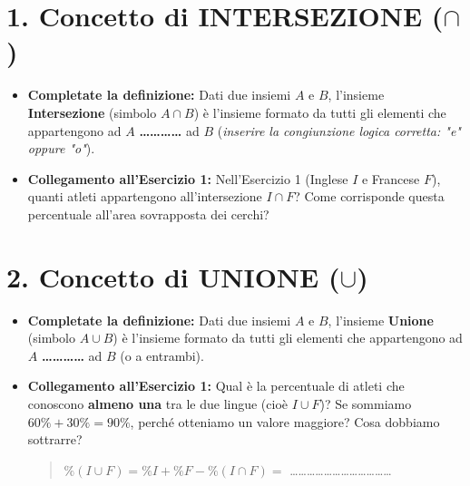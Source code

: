 \documentclass[11pt, a4paper]{article}
\begin{document}
\section*{1. Concetto di INTERSEZIONE ($\cap$)}
\begin{itemize}
    \item \textbf{Completate la definizione:} Dati due insiemi $A$ e $B$, l'insieme \textbf{Intersezione} (simbolo $A \cap B$) è l'insieme formato da tutti gli elementi che appartengono ad $A$ \textbf{\dots\dots\dots\dots} ad $B$ (\textit{inserire la congiunzione logica corretta: "e" oppure "o"}).
    \item \textbf{Collegamento all'Esercizio 1:} Nell'Esercizio 1 (Inglese $I$ e Francese $F$), quanti atleti appartengono all'intersezione $I \cap F$? Come corrisponde questa percentuale all'area sovrapposta dei cerchi? \dotfill
\end{itemize}

\vspace{-1mm}

\section*{2. Concetto di UNIONE ($\cup$)}
\begin{itemize}
    \item \textbf{Completate la definizione:} Dati due insiemi $A$ e $B$, l'insieme \textbf{Unione} (simbolo $A \cup B$) è l'insieme formato da tutti gli elementi che appartengono ad $A$ \textbf{\dots\dots\dots\dots} ad $B$ (o a entrambi).
    \item \textbf{Collegamento all'Esercizio 1:} Qual è la percentuale di atleti che conoscono \textbf{almeno una} tra le due lingue (cioè $I \cup F$)? Se sommiamo $60\% + 30\% = 90\%$, perché otteniamo un valore maggiore? Cosa dobbiamo sottrarre?
    \begin{quote}
    $\% (I \cup F) = \% I + \% F - \% (I \cap F) = $ \dots\dots\dots\dots\dots\dots\dots\dots\dots\dots\dots\dots
    \end{quote}
\end{itemize}

\vspace{-1mm}
\end{document}
